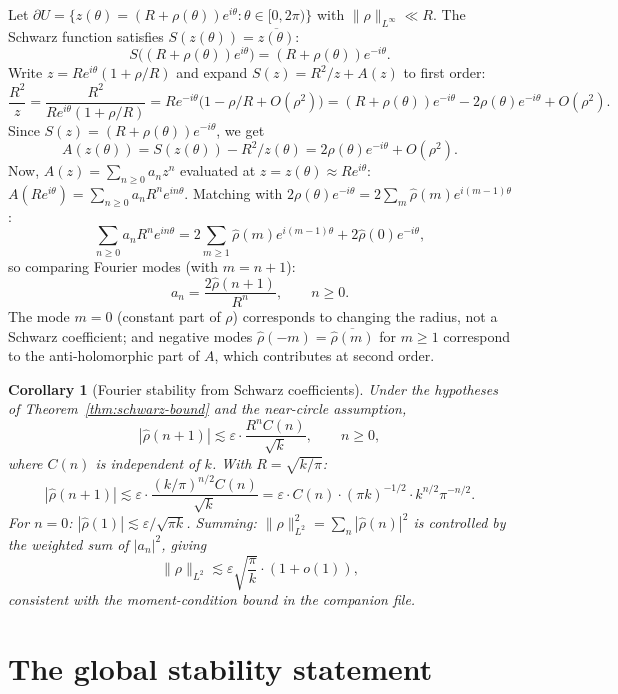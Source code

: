 \documentclass[a4paper,11pt,reqno]{amsart}
\newtheorem{corollary}{Corollary}[section]
\begin{document}
Let $\partial U=\{z(\theta)=(R+\rho(\theta))e^{i\theta}:\theta\in[0,2\pi)\}$
with $\|\rho\|_{L^\infty}\ll R$. The Schwarz function satisfies $S(z(\theta))=\overline{z(\theta)}$:
\[
S\bigl((R+\rho(\theta))e^{i\theta}\bigr)=(R+\rho(\theta))e^{-i\theta}.
\]
Write $z=Re^{i\theta}(1+\rho/R)$ and expand $S(z)=R^2/z+A(z)$ to first order:
\[
\frac{R^2}{z}=\frac{R^2}{Re^{i\theta}(1+\rho/R)}
=Re^{-i\theta}\bigl(1-\rho/R+O(\rho^2)\bigr)
=(R+\rho(\theta))e^{-i\theta}-2\rho(\theta)e^{-i\theta}+O(\rho^2).
\]
Since $S(z)=(R+\rho(\theta))e^{-i\theta}$, we get
\[
A(z(\theta))=S(z(\theta))-R^2/z(\theta)=2\rho(\theta)e^{-i\theta}+O(\rho^2).
\]
Now, $A(z)=\sum_{n\ge0}a_n z^n$ evaluated at $z=z(\theta)\approx Re^{i\theta}$:
$A(Re^{i\theta})=\sum_{n\ge0}a_n R^n e^{in\theta}$.
Matching with $2\rho(\theta)e^{-i\theta}=2\sum_m\hat\rho(m)e^{i(m-1)\theta}$:
\[
\sum_{n\ge0}a_n R^n e^{in\theta}=2\sum_{m\ge1}\hat\rho(m)e^{i(m-1)\theta}+2\hat\rho(0)e^{-i\theta},
\]
so comparing Fourier modes (with $m=n+1$):
\begin{equation}\label{eq:schwarz-fourier}
a_n=\frac{2\hat\rho(n+1)}{R^n},\qquad n\ge0.
\end{equation}
The mode $m=0$ (constant part of $\rho$) corresponds to changing the radius, not a
Schwarz coefficient; and negative modes $\hat\rho(-m)=\overline{\hat\rho(m)}$ for $m\ge1$
correspond to the anti-holomorphic part of $A$, which contributes at second order.

\begin{corollary}[Fourier stability from Schwarz coefficients]
Under the hypotheses of Theorem~\ref{thm:schwarz-bound} and the near-circle assumption,
\[
|\hat\rho(n+1)|\lesssim\varepsilon\cdot\frac{R^n C(n)}{\sqrt{k}},\qquad n\ge0,
\]
where $C(n)$ is independent of $k$. With $R=\sqrt{k/\pi}$:
\[
|\hat\rho(n+1)|\lesssim\varepsilon\cdot\frac{(k/\pi)^{n/2}C(n)}{\sqrt{k}}
=\varepsilon\cdot C(n)\cdot(\pi k)^{-1/2}\cdot k^{n/2}\pi^{-n/2}.
\]
For $n=0$: $|\hat\rho(1)|\lesssim\varepsilon/\sqrt{\pi k}$.
Summing: $\|\rho\|_{L^2}^2=\sum_n|\hat\rho(n)|^2$ is controlled by the
weighted sum of $|a_n|^2$, giving
\begin{equation}\label{eq:l2-schwarz}
\|\rho\|_{L^2}\lesssim\varepsilon\sqrt{\frac{\pi}{k}}\cdot(1+o(1)),
\end{equation}
consistent with the moment-condition bound in the companion file.
\end{corollary}

\section{The global stability statement}
\label{sec:global}
\end{document}
